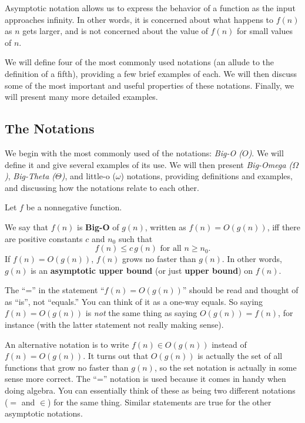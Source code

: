 Asymptotic notation allows us to express the behavior of a function as the input
approaches infinity.  In other words, it is concerned about what happens to $f(n)$
as $n$ gets larger, and is not concerned about the value of $f(n)$ for small values of $n$.


We will define four of the most commonly used notations (an allude to the definition
of a fifth), providing a few brief examples of each.  We will then discuss some of
the most important and useful properties of these notations.  Finally, we will
present many more detailed examples.  

\subsection{The Notations}
We begin with the most commonly used of the notations: {\em Big-O ($O$)}. We will define it and give several examples
of its use. We will then present {\em Big-Omega ($\Omega$)}, {\em Big-Theta ($\Theta$)}, and {\rm little-o ($\omega$)} notations,
providing definitions and examples, and discussing how the notations relate to each other.

\newpage %

\begin{df}[Big-O]
Let $f$ be a nonnegative function. 

\medskip
\noindent
\begin{minipage}{.4\textwidth}
We say that $f(n)$ is {\bf Big-O} of $g(n)$, written as 
$f(n) = O(g(n))$,
iff there are positive constants $c$ and $n_{0}$ such that
$$f(n)\leq c\,g(n)\mbox{ for all }n \ge n_{0}.$$
If $f(n)=O(g(n))$, $f(n)$ grows no faster than $g(n)$. 
In other words, $g(n)$ is an {\bf asymptotic upper bound} (or just {\bf upper bound})
on $f(n)$.
\end{minipage}
\hfill
\begin{minipage}{.55\textwidth}
\end{minipage}
\end{df}

\begin{rem}
The ``='' in the statement ``$f(n)=O(g(n))$'' should be read and thought of as ``is'', not ``equals.''
You can think of it as a one-way equals.  So saying $f(n)=O(g(n))$ is {\em not}
the same thing as saying $O(g(n))=f(n)$, for instance 
(with the latter statement not really making sense).

An alternative notation is to write $f(n)\in O(g(n))$  instead of $f(n)=O(g(n))$. 
It turns out that $O(g(n))$ is actually the set of all functions that grow no 
faster than $g(n)$,
so the set notation is actually in some sense more correct.
The ``='' notation is used because it comes in handy when doing algebra.
You can essentially think of these as being two different notations ($=$ and $\in$) 
for the same thing.
Similar statements are true for the other asymptotic notations.
\end{rem}

